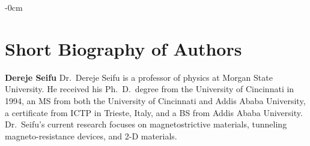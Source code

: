 \documentclass[molecules,review,submit,pdftex,moreauthors]{Definitions/mdpi}
\begin{document}

\begin{adjustwidth}{-\extralength}{0cm}



%





\section*{Short Biography of Authors}

\bio

{}
{\textbf{Dereje Seifu} Dr.~Dereje Seifu is a professor of physics at Morgan State University.  He received his Ph.~D.~degree from the University of Cincinnati in 1994, an MS from both the University of Cincinnati and Addis Ababa University, a certificate from ICTP in Trieste, Italy, and a BS from Addis Ababa University.  Dr.~Seifu's current research focuses on magnetostrictive materials, tunneling magneto-resistance devices, and 2-D materials.}



\end{adjustwidth}
\end{document}
